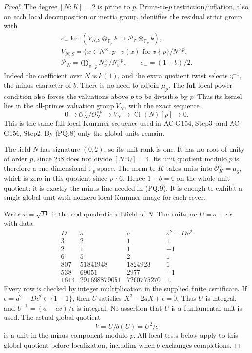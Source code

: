 \begin{proof}
The degree $[N:K]=2$ is prime to $p$.
Prime-to-$p$ restriction/inflation, also on each local decomposition
or inertia group, identifies the residual strict group with
\[
 \begin{gathered}
 e_-\ker\left(V_{N,S}\otimes_{\mathbb F_p}k
                   \longrightarrow\mathcal P_N\otimes_{\mathbb F_p}k\right),\\
 V_{N,S}=\{x\in N^\times:p\mid v(x)\text{ for }v\nmid p\}/N^{\times p},\\
 \mathcal P_N=\bigoplus_{v\mid p}N_v^\times/N_v^{\times p},
                         \qquad e_-=(1-b)/2.
 \end{gathered}
 \tag{PQ.9}
\]
Indeed the coefficient over $N$ is $k(1)$, and the extra quotient
twist selects $\eta^{-1}$, the minus character of $b$.
There is no need to adjoin $\mu_p$.
The full local power condition also forces the valuations above
$p$ to be divisible by $p$.
Thus its kernel lies in the all-primes valuation group $V_N$,
with the exact sequence
\[
 0\longrightarrow\mathcal O_N^\times/\mathcal O_N^{\times p}
 \longrightarrow V_N\longrightarrow\operatorname{Cl}(N)[p]
 \longrightarrow0.
 \tag{PQ.10}
\]
This is the same full-local Kummer sequence used in AC-G154,
Step3, and AC-G156, Step2.
By (PQ.8) only the global units remain.

The field $N$ has signature $(0,2)$, so its unit rank is one.
It has no root of unity of order $p$, since $268$ does not divide
$[N:\mathbb Q]=4$.
Its unit quotient modulo $p$ is therefore a one-dimensional
$\mathbb F_p$-space.
The norm to $K$ takes units into $\mathcal O_K^\times=\mu_6$,
which is zero in this quotient since $p\nmid6$.
Hence $1+b=0$ on the whole unit quotient: it is exactly the
minus line needed in (PQ.9).
It is enough to exhibit a single global unit with nonzero
local Kummer image for each cover.

Write $x=\sqrt D$ in the real quadratic subfield of $N$.
The units are $U=a+cx$, with data
\[
 \begin{array}{r|r|r|r}
 D&a&c&a^2-Dc^2\\ \hline
 3&2&1&1\\
 2&1&1&-1\\
 6&5&2&1\\
 807&51841948&1824923&1\\
 538&69051&2977&-1\\
 1614&291698879051&7260775270&1.
 \end{array}
 \tag{PQ.11}
\]
Every row is checked by integer multiplication in the supplied
finite certificate.  If $\epsilon=a^2-Dc^2\in\{1,-1\}$,
then $U$ satisfies $X^2-2aX+\epsilon=0$.
Thus $U$ is integral, and $U^{-1}=(a-cx)/\epsilon$ is integral.
No assertion that $U$ is a fundamental unit is used.
The actual global quotient
\[
                     V=U/b(U)=U^2/\epsilon
 \tag{PQ.12}
\]
is a unit in the minus component modulo $p$.
All local tests below apply to this global quotient before
localization, including when $b$ exchanges completions.


\end{proof}
